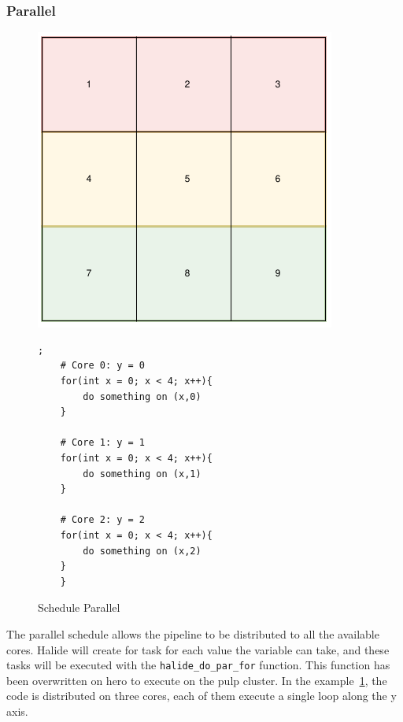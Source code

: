 \subsubsection{Parallel}
\begin{figure}[H]

		\begin{minipage}[c]{\EIW}
			\centering
		\includegraphics[width=\textwidth]{Images/Parallel.png}
		\end{minipage}
		\begin{minipage}[c]{\ECW}
			\centering
			\begin{lstlisting}[label={code:reorder}];
	# Core 0: y = 0
	for(int x = 0; x < 4; x++){
		do something on (x,0)
	}

	# Core 1: y = 1
	for(int x = 0; x < 4; x++){
		do something on (x,1)
	}

	# Core 2: y = 2
	for(int x = 0; x < 4; x++){
		do something on (x,2)
	}
	}
\end{lstlisting}
		\end{minipage}
		\caption{Schedule Parallel}
		\label{schedule:parallel}
\end{figure}

The parallel schedule allows the pipeline to be distributed to all the available cores. Halide will create for task for each value the variable can take, and these tasks will be executed with the \verb|halide_do_par_for| function. This function has been overwritten on hero to execute on the \gls{pulp} cluster. In the example~\ref{schedule:parallel}, the code is distributed on three cores, each of them execute a single loop along the y axis.

